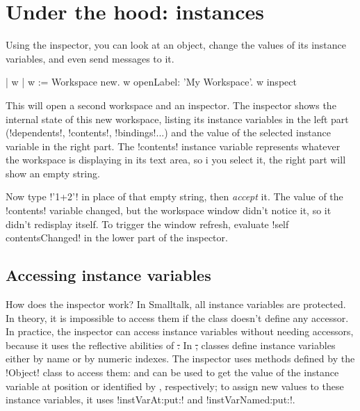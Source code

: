 \documentclass[a4paper,10pt,twoside]{book}
\begin{document}
\section{Under the hood: instances} %

Using the inspector, you can look at an object, change the values of its instance variables, and even send messages to it.

\begin{code}{| w |}
w := Workspace new.
w openLabel: 'My Workspace'.
w inspect
\end{code}

This will open a second workspace and an inspector.
The inspector shows the internal state of this new workspace, listing its instance variables in the left part (\ct!dependents!, \ct!contents!, \ct!bindings!...) and the value of the selected instance variable in the right part.
The \ct!contents! instance variable represents whatever the workspace is displaying in its text area, so i you select it, the right part will show an empty string.



Now type \ct!'1+2'! in place of that empty string, then \emph{accept} it.
The value of the \ct!contents! variable changed, but the workspace window didn't notice it, so it didn't redisplay itself.
To trigger the window refresh, evaluate \ct!self contentsChanged! in the lower part of the inspector. 

\subsection{Accessing instance variables}

How does the inspector work?
In Smalltalk, all instance variables are protected.
In theory, it is impossible to access them if the class doesn't define any accessor.
In practice, the inspector can access instance variables without needing accessors, because it uses the reflective abilities of \st.
In \st, classes define instance variables either by name or by numeric indexes.
The inspector uses methods defined by the \ct!Object! class to access them:  and  can be used to get the value of the instance variable at position  or identified by , respectively; to assign new values to these instance variables, it uses \ct!instVarAt:put:! and \ct!instVarNamed:put:!.
\end{document}
